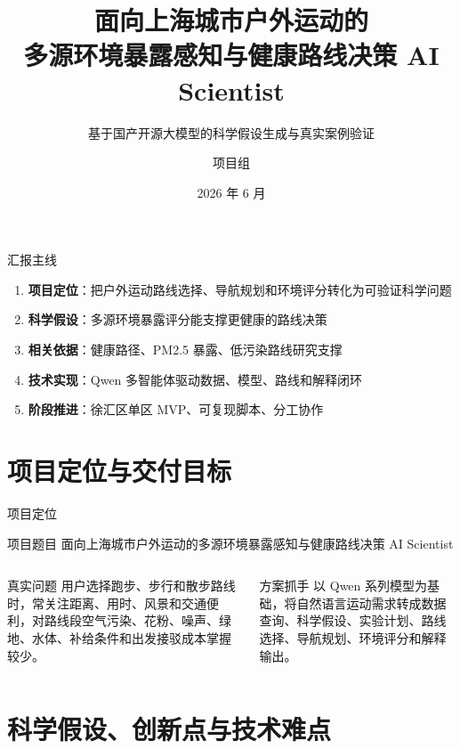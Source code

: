 \documentclass[xcolor=table,dvipsnames,svgnames,aspectratio=169]{ctexbeamer}
\author{项目组}
\institute{上海交通大学}
\date{2026 年 6 月}
\title[环境暴露感知与健康路线决策 AI Scientist]
{\textbf{面向上海城市户外运动的\\多源环境暴露感知与健康路线决策 AI Scientist}}
\subtitle{基于国产开源大模型的科学假设生成与真实案例验证}
\newcommand{\kw}[1]{\textbf{\color{cprimary}#1}}
\newcommand{\smallitem}{\setlength{\itemsep}{0.25em}}
\begin{document}
\maketitle

\begin{frame}{汇报主线}
  \begin{enumerate}
    \smallitem
    \item \kw{项目定位}：把户外运动路线选择、导航规划和环境评分转化为可验证科学问题
    \item \kw{科学假设}：多源环境暴露评分能支撑更健康的路线决策
    \item \kw{相关依据}：健康路径、PM2.5 暴露、低污染路线研究支撑
    \item \kw{技术实现}：Qwen 多智能体驱动数据、模型、路线和解释闭环
    \item \kw{阶段推进}：徐汇区单区 MVP、可复现脚本、分工协作
  \end{enumerate}
\end{frame}

\section{项目定位与交付目标}

\begin{frame}{项目定位}
  \begin{block}{项目题目}
    面向上海城市户外运动的多源环境暴露感知与健康路线决策 AI Scientist
  \end{block}

  \vspace{0.4em}
  \begin{columns}[T]
    \begin{block}{真实问题}
      用户选择跑步、步行和散步路线时，常关注距离、用时、风景和交通便利，对路线段空气污染、花粉、噪声、绿地、水体、补给条件和出发接驳成本掌握较少。
    \end{block}

    \begin{block}{方案抓手}
      以 Qwen 系列模型为基础，将自然语言运动需求转成数据查询、科学假设、实验计划、路线选择、导航规划、环境评分和解释输出。
    \end{block}
  \end{columns}
\end{frame}

\section{科学假设、创新点与技术难点}
\end{document}
